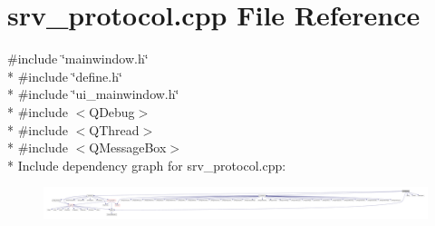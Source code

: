 \hypertarget{a00049}{\section{srv\+\_\+protocol.\+cpp File Reference}
\label{a00049}
}
{\ttfamily \#include \char`\"{}mainwindow.\+h\char`\"{}}\\*
{\ttfamily \#include \char`\"{}define.\+h\char`\"{}}\\*
{\ttfamily \#include \char`\"{}ui\+\_\+mainwindow.\+h\char`\"{}}\\*
{\ttfamily \#include $<$Q\+Debug$>$}\\*
{\ttfamily \#include $<$Q\+Thread$>$}\\*
{\ttfamily \#include $<$Q\+Message\+Box$>$}\\*
Include dependency graph for srv\+\_\+protocol.\+cpp\+:
\nopagebreak
\begin{figure}[H]
\begin{center}
\leavevmode
\includegraphics[width=350pt]{da/de7/a00210}
\end{center}
\end{figure}

